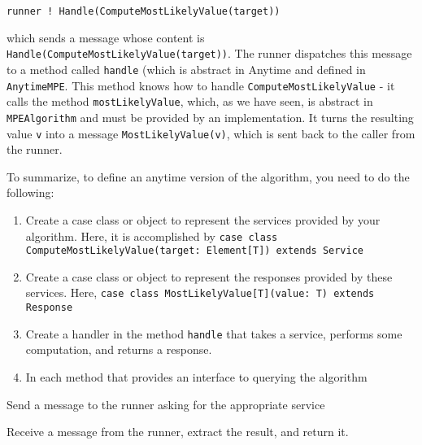 \begin{flushleft}
\texttt{runner ! Handle(ComputeMostLikelyValue(target))}
\end{flushleft}

which sends a message whose content is \texttt{Handle(ComputeMostLikely\-Value(target))}. The runner dispatches this message to a method called \texttt{handle} (which is abstract in Anytime and defined in \texttt{AnytimeMPE}. This method knows how to handle \texttt{ComputeMostLikelyValue} - it calls the method \texttt{mostLike\-lyValue}, which, as we have seen, is abstract in \texttt{MPEAlgorithm} and must be provided by an implementation. It turns the resulting value \texttt{v} into a message \texttt{MostLikelyValue(v)}, which is sent back to the caller from the runner.


To summarize, to define an anytime version of the algorithm, you need to do the following:

\begin{enumerate}
\item Create a case class or object to represent the services provided by your algorithm. Here, it is accomplished by
\newline \texttt{case class ComputeMostLikelyValue(target: Element[T]) 
\newline extends Service}
\item Create a case class or object to represent the responses provided by these
services. Here,
\newline \texttt{case class MostLikelyValue[T](value: T)
\newline extends Response} 
\item Create a handler in the method \texttt{handle} that takes a service, performs some computation, and returns a response.
\item In each method that provides an interface to querying the algorithm
\end{enumerate}
\begin{aenumerate}
\item Send a message to the runner asking for the appropriate service
\item Receive a message from the runner, extract the result, and return it.
\end{aenumerate}